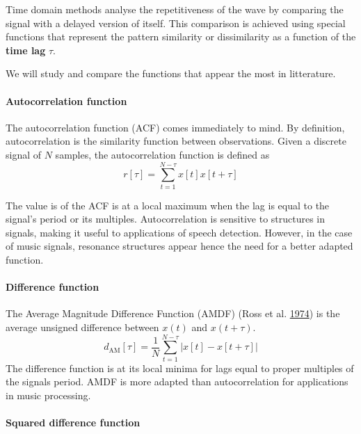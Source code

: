 \documentclass[american,]{article}
\let\oldparagraph\paragraph
\renewcommand{\paragraph}[1]{\oldparagraph{#1}\mbox{}}
\begin{document}
Time domain methods analyse the repetitiveness of the wave
by comparing the signal with a delayed version of itself.
This comparison is achieved using special functions that
represent the pattern similarity or dissimilarity
as a function of the \textbf{time lag} \(\tau\).

We will study and compare the functions that
appear the most in litterature.

\hypertarget{autocorrelation-function}{%
\paragraph{Autocorrelation function}\label{autocorrelation-function}}

The autocorrelation function (ACF) comes immediately to mind.
By definition, autocorrelation is the similarity
function between observations.
Given a discrete signal of \(N\) samples, the autocorrelation
function is defined as
\[r[\tau] = \sum_{t=1}^{N-\tau} x[t]x[t+\tau]\]

The value is of the ACF is at a local maximum when the lag is equal
to the signal's period or its multiples.
Autocorrelation is sensitive to structures in signals,
making it useful to applications of speech detection.
However, in the case of music signals, resonance structures
appear hence the need for a better adapted function.

\hypertarget{difference-function}{%
\paragraph{Difference function}\label{difference-function}}

The Average Magnitude Difference Function (AMDF) (Ross et al. \protect\hyperlink{ref-ross_average_1974}{1974})
is the average unsigned difference between \(x(t)\) and \(x(t+\tau)\).
\[d_{\text{AM}}[\tau] = \frac{1}{N}
    \sum_{t=1}^{N-\tau} \left\lvert x[t]-x[t+\tau]\right\rvert\]
The difference function is at its local minima for lags equal to
proper multiples of the signals period.
AMDF is more adapted than autocorrelation for applications
in music processing.

\hypertarget{squared-difference-function}{%
\paragraph{Squared difference function}\label{squared-difference-function}}
\end{document}
